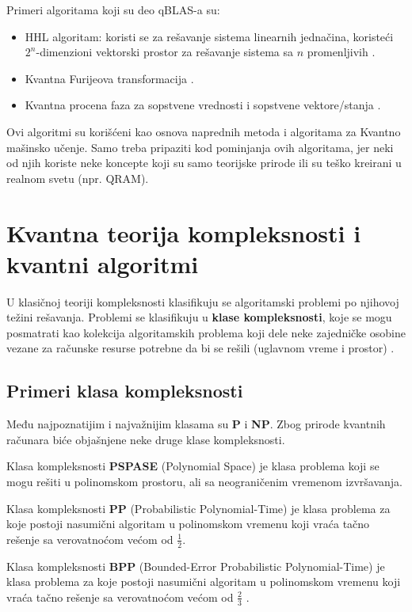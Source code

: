 \documentclass[12pt, letterpaper, oneside]{article}
\begin{document}
Primeri algoritama koji su deo qBLAS-a su: 
\begin{itemize}
    \item HHL algoritam: koristi se za rešavanje sistema linearnih jednačina, koristeći $2^n$-dimenzioni vektorski prostor
        za rešavanje sistema sa $n$ promenljivih \cite{Quantum_machine_learning}.
    \item Kvantna Furijeova transformacija \cite{Classical&quantum_info_Fourie_Phase}.
    \item Kvantna procena faza za sopstvene vrednosti i sopstvene vektore/stanja \cite{Classical&quantum_info_Fourie_Phase}.
\end{itemize}
Ovi algoritmi su korišćeni kao osnova naprednih metoda i algoritama za Kvantno mašinsko učenje.
Samo treba pripaziti kod pominjanja ovih algoritama, jer neki od njih koriste neke koncepte koji su samo teorijske prirode ili su teško kreirani u realnom svetu (npr. QRAM).

\newpage
\section{Kvantna teorija kompleksnosti i kvantni algoritmi}
U klasičnoj teoriji kompleksnosti klasifikuju se algoritamski problemi po njihovoj težini rešavanja.
Problemi se klasifikuju u \textbf{klase kompleksnosti}, koje se mogu posmatrati kao kolekcija algoritamskih problema koji dele neke zajedničke osobine
vezane za računske resurse potrebne da bi se rešili (uglavnom vreme i prostor) \cite{nielsen_chuang_10th}.

\subsection{Primeri klasa kompleksnosti}
Među najpoznatijim i najvažnijim klasama su \textbf{P} i \textbf{NP}. Zbog prirode kvantnih računara biće objašnjene neke druge klase kompleksnosti.

Klasa kompleksnosti \textbf{PSPASE} (Polynomial Space) je klasa problema koji se mogu rešiti u polinomskom prostoru, ali sa neograničenim vremenom izvršavanja.


Klasa kompleksnosti \textbf{PP} (Probabilistic Polynomial-Time) je klasa problema za koje postoji nasumični algoritam u polinomskom vremenu koji vraća
tačno rešenje sa verovatnoćom većom od $\frac{1}{2}$.

Klasa kompleksnosti \textbf{BPP} (Bounded-Error Probabilistic Polynomial-Time) je klasa problema za koje postoji nasumični algoritam u polinomskom vremenu koji vraća
tačno rešenje sa verovatnoćom većom od $\frac{2}{3}$ \cite{aaronson2013quantum}.
\end{document}
